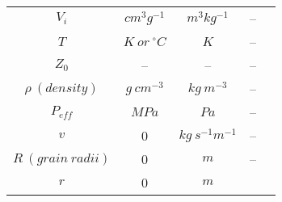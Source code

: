 \documentclass[a4paper,11pt]{article}
\begin{document}
\begin{longtable}{|c|c|c|c|c|}
\hline
\begin{math} V_i \end{math} &
\begin{math} cm^3g^{-1} \end{math} &
\begin{math} m^3kg^{-1} \end{math} &
-- & \\
\cline{1-4}
\begin{math} T \end{math} &
\begin{math} K \: or \: ^\circ C \end{math} &
\begin{math} K \end{math} &
-- & \\
\cline{1-4}
\begin{math} Z_0 \end{math} &
-- &
-- &
-- & \\
\cline{1-4}
\begin{math}\rho \: (density) \end{math} &
\begin{math} g \: cm^{-3} \end{math} &
\begin{math} kg \: m^{-3} \end{math} &
-- & \\
\cline{1-4}
\begin{math} P_{eff} \end{math} &
\begin{math} MPa \end{math} &
\begin{math} Pa \end{math} &
-- & \\
\cline{1-4}
\begin{math} v \end{math} &
0 &
\begin{math} kg \: s^{-1}m^{-1} \end{math} &
-- & \\
\cline{1-4}
\begin{math} R \: (grain \: radii) \end{math} &
0 &
\begin{math} m \end{math} &
-- & \\
\cline{1-4}
\begin{math} r \end{math} &
0 &
\begin{math} m \end{math} &

\end{longtable}
\end{document}
